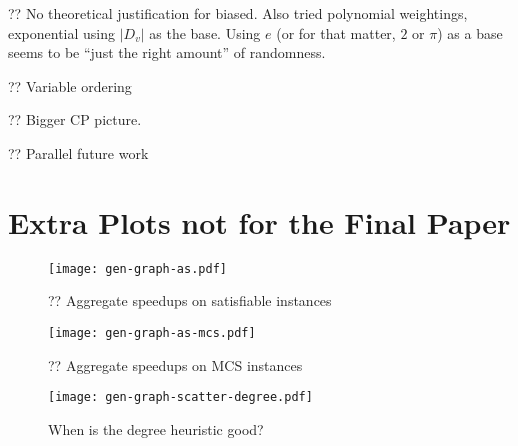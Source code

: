 \documentclass{article}
\begin{document}
?? No theoretical justification for biased. Also tried polynomial weightings, exponential using
$\left|D_v\right|$ as the base. Using $e$ (or for that matter, $2$ or $\pi$) as a base seems to be
``just the right amount'' of randomness.

?? Variable ordering

?? Bigger CP picture.

?? Parallel future work




\clearpage
\appendix

\section{Extra Plots not for the Final Paper}

\begin{figure}[h]
    \centering
    \texttt{[image: gen-graph-as.pdf]}
    \caption{?? Aggregate speedups on satisfiable instances}
\end{figure}

\begin{figure}[h]
    \centering
    \texttt{[image: gen-graph-as-mcs.pdf]}
    \caption{?? Aggregate speedups on MCS instances}
\end{figure}

\begin{figure}[h]
    \centering
    \texttt{[image: gen-graph-scatter-degree.pdf]}

    \caption{When is the degree heuristic good?}
    \label{figure:scatter-degree}
\end{figure}
\end{document}
